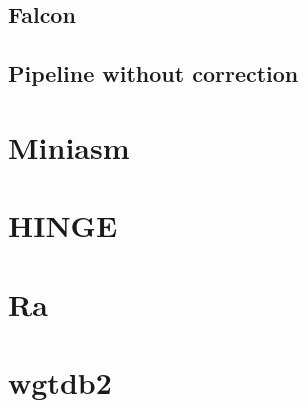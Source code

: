 \documentclass[main.tex]{subfiles}
\begin{document}
\subsection{Falcon}

\subsection{Pipeline without correction}

\section{Miniasm}

\section{HINGE}

\section{Ra}

\section{wgtdb2}

\end{document}
